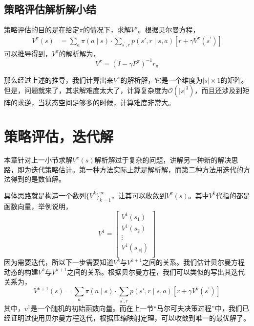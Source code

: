 \documentclass[a4paper]{article}
\begin{document}
\subsection{策略评估解析解小结}
策略评估的目的是在给定$\pi$的情况下，求解$V^\pi$。根据贝尔曼方程，
\begin{equation}\begin{aligned}
V^{\pi}(s)
&=\sum_{a} \pi(a \mid s) \cdot \sum_{s^{\prime}, r} p\left(s' , r \mid s,a\right)\left[r+\gamma V^{\pi}\left(s^{\prime}\right)\right]
\end{aligned}\end{equation}
可以推导得到，$V^\pi$的解析解为，
\begin{equation}
    V^\pi = (I-\gamma P^\pi)^{-1}r_\pi
\end{equation}


那么经过上述的推导，我们计算出来$V^\pi$的解析解，它是一个维度为$|s|\times 1$的矩阵。但是，问题就来了，其求解难度太大了，计算复杂度为$\mathcal{O}(|s|^3)$，而且还涉及到矩阵的求逆，当状态空间足够多的时候，计算难度非常大。

\section{策略评估，迭代解}
本章针对上一小节求解$V^\pi(s)$解析解过于复杂的问题，讲解另一种新的解决思路，即为迭代策略估计。第一种方法实际上就是解析解，而第二种方法用迭代的方法得到的是数值解。

具体思路就是构造一个数列$\{V^k\}_{k=1}^\infty$，让其可以收敛到$V^\pi(s)$。其中$V^k$代指的都是函数向量，举例说明，
\begin{equation}
    V^1=
    \begin{bmatrix}
    V^1(s_1) \\
    V^1(s_2) \\
    \vdots \\
    V^1(s_{|s|}) \\
    \end{bmatrix}
\end{equation}
因为需要迭代，所以下一步需要知道$V^k$与$V^{k+1}$之间的关系。我们估计贝尔曼方程动态的构建$V^k$与$V^{k+1}$之间的关系。根据贝尔曼方程，我们可以类似的写出其迭代关系为，
\begin{equation}
   V^{k+1}(s) =\sum_{a} \pi(a \mid s) \cdot \sum_{s^{\prime}, r} p\left(s' , r \mid s,a\right)\left[r+\gamma V^{k}\left(s^{\prime}\right)\right] 
\end{equation}
其中，$v^1$是一个随机的初始函数向量。而在上一节“马尔可夫决策过程”中，我们已经证明过使用贝尔曼方程迭代，根据压缩映射定理，可以收敛到唯一的最优解了。
\end{document}

